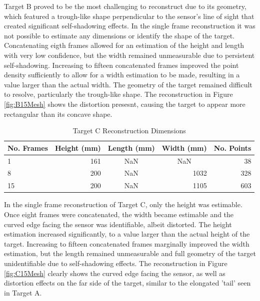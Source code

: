 Target B proved to be the most challenging to reconstruct due to its geometry, which featured a trough-like shape perpendicular to the sensor's line of sight that created significant self-shadowing effects. In the single frame reconstruction it was not possible to estimate any dimensions or identify the shape of the target. Concatenating eigth frames allowed for an estimation of the height and length with very low confidence, but the width remained unmeasurable due to persistent self-shadowing. Increasing to fifteen concatenated frames improved the point density sufficiently to allow for a width estimation to be made, resulting in a value larger than the actual width. The geometry of the target remained difficult to resolve, particularly the trough-like shape. The reconstruction in Figure \ref{fig:B15Mesh} shows the distortion presesnt, causing the target to appear more rectangular than its concave shape. 

\begin{table}[H]
\centering
\begin{tabular}{|l|r|c|c|r|}
\hline
\multicolumn{1}{|c|}{\textbf{No. Frames}} &
  \multicolumn{1}{c|}{\textbf{Height (mm)}} &
  \textbf{Length (mm)} &
  \textbf{Width (mm)} &
  \multicolumn{1}{l|}{\textbf{No. Points}} \\ \hline
1  & 161 & NaN & NaN                       & 38  \\ \hline
8  & 200 & NaN & \multicolumn{1}{r|}{1032} & 328 \\ \hline
15 & 200 & NaN & \multicolumn{1}{r|}{1105} & 603 \\ \hline
\end{tabular}
\caption{Target C Reconstruction Dimensions}
\label{tab:target_c}
\end{table}
In the single frame reconstruction of Target C, only the height was estimable. Once eight frames were concatenated, the width became estimable and the curved edge facing the sensor was identifiable, albeit distorted. The height estimation increased significantly, to a value larger than the actual height of the target. Increasing to fifteen concatenated frames marginally improved the width estimation, but the length remained unmeasurable and full geometry of the target unidentifiable due to self-shadowing effects. The reconstruction in Figure \ref{fig:C15Mesh} clearly shows the curved edge facing the sensor, as well as distortion effects on the far side of the target, similar to the elongated 'tail' seen in Target A.

